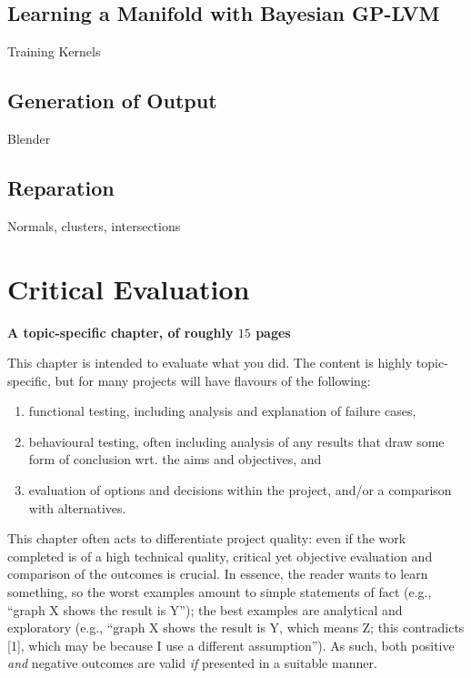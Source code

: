 \documentclass[ %
                    author={Dillon Keith Diep [INCOMPLETE DRAFT, NOT FOR SUBMISSION]},
                supervisor={Dr. Carl Henrik Ek},
                    degree={MEng},
                     title={ART-CG:},
                  subtitle={Assisted Real-Time Content Generation of 3D Hair Geometry},
                      type={Research},
                      year={2014} ]{dissertation}
\begin{document}
\section{Learning a Manifold with Bayesian GP-LVM}
Training
Kernels

\section{Generation of Output}
Blender

\section{Reparation}
Normals, clusters, intersections


\chapter{Critical Evaluation}
\label{chap:evaluation}

{\bf A topic-specific chapter, of roughly $15$ pages} 
\vspace{1cm} 

\noindent
This chapter is intended to evaluate what you did.  The content is highly 
topic-specific, but for many projects will have flavours of the following:

\begin{enumerate}
\item functional  testing, including analysis and explanation of failure 
      cases,
\item behavioural testing, often including analysis of any results that 
      draw some form of conclusion wrt. the aims and objectives,
      and
\item evaluation of options and decisions within the project, and/or a
      comparison with alternatives.
\end{enumerate}

\noindent
This chapter often acts to differentiate project quality: even if the work
completed is of a high technical quality, critical yet objective evaluation 
and comparison of the outcomes is crucial.  In essence, the reader wants to
learn something, so the worst examples amount to simple statements of fact 
(e.g., ``graph X shows the result is Y''); the best examples are analytical 
and exploratory (e.g., ``graph X shows the result is Y, which means Z; this 
contradicts [1], which may be because I use a different assumption'').  As 
such, both positive {\em and} negative outcomes are valid {\em if} presented 
in a suitable manner.
\end{document}

